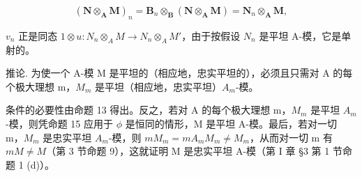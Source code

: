 \[
(\mathbf {N} \otimes_ {\mathbf {A}} \mathbf {M}) _ {n} = \mathbf {B} _ {n} \otimes_ {\mathbf {B}} (\mathbf {N} \otimes_ {\mathbf {A}} \mathbf {M}) = \mathbf {N} _ {n} \otimes_ {\mathbf {A}} \mathbf {M},
\]

\(v_{n}\) 正是同态 \(1 \otimes u: N_{n} \otimes_{A} M \to N_{n} \otimes_{A} M'\)，由于按假设 \(N_{n}\) 是平坦 A-模，它是单射的。

推论. 为使一个 A-模 M 是平坦的（相应地，忠实平坦的），必须且只需对 A 的每个极大理想 m，\(M_{m}\) 是平坦（相应地，忠实平坦）\(A_{m}\)-模。

条件的必要性由命题 13 得出。反之，若对 A 的每个极大理想 m，\(M_{m}\) 是平坦 \(A_{m}\)-模，则凭命题 15 应用于 \(\phi\) 是恒同的情形，M 是平坦 A-模。最后，若对一切 m，\(M_{m}\) 是忠实平坦 \(A_{m}\)-模，则 \(mM_{m} = mA_{m}M_{m} \neq M_{m}\)，从而对一切 m 有 \(mM \neq M\)（第 3 节命题 9），这就证明 M 是忠实平坦 A-模（第 I 章 §3 第 1 节命题 1 (d)）。

